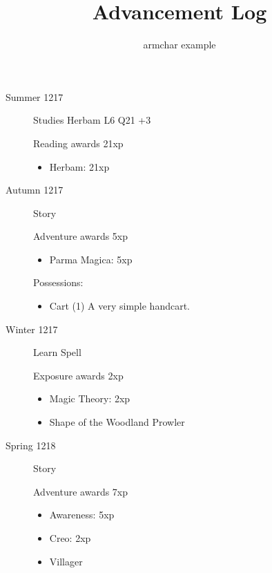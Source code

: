 \documentclass{scrartcl}
\title{Advancement Log}
\author{armchar example}
\begin{document}
\maketitle
\begin{description}
  \item[Summer 1217]
    Studies Herbam L6 Q21 +3

    Reading awards 21xp
    \begin{itemize}
      \item Herbam: 21xp
    \end{itemize}
  \item[Autumn 1217]
    Story

    Adventure awards 5xp
    \begin{itemize}
      \item Parma Magica: 5xp
    \end{itemize}
    Possessions:
    \begin{itemize}
      \item Cart (1)
             A very simple handcart.
    \end{itemize}
  \item[Winter 1217]
    Learn Spell

    Exposure awards 2xp
    \begin{itemize}
      \item Magic Theory: 2xp
      \item Shape of the Woodland Prowler
    \end{itemize}
  \item[Spring 1218]
    Story

    Adventure awards 7xp
    \begin{itemize}
      \item Awareness: 5xp
      \item Creo: 2xp
      \item Villager
    \end{itemize}
\end{description}
\end{document}
